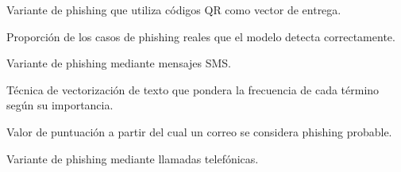 \documentclass[11pt,a4paper,oneside]{report}
\begin{document}
\begin{description}[style=nextline,leftmargin=3.3cm]
  \item[Quishing] Variante de phishing que utiliza códigos QR como vector de entrega.
  \item[Recall] Proporción de los casos de phishing reales que el modelo detecta correctamente.
  \item[Smishing] Variante de phishing mediante mensajes SMS.
  \item[TF-IDF] Técnica de vectorización de texto que pondera la frecuencia de cada término según su importancia.
  \item[Umbral (threshold)] Valor de puntuación a partir del cual un correo se considera phishing probable.
  \item[Vishing] Variante de phishing mediante llamadas telefónicas.
\end{description}
\end{document}
